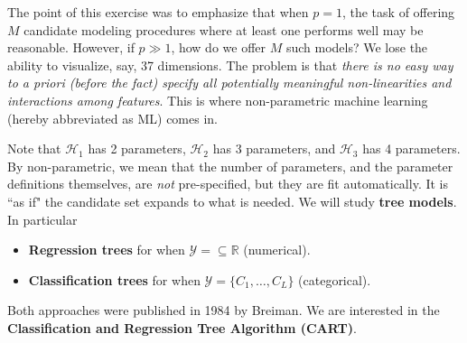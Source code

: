 \documentclass[12pt, a4paper]{article}
\theoremstyle{definition}
\begin{document}
	The point of this exercise was to emphasize that when $p = 1$, the task of
	offering $M$ candidate modeling procedures where at least one performs well
	may be reasonable. However, if $p \gg 1$, how do we offer $M$ such models? We
	lose the ability to visualize, say, 37 dimensions. The problem is that
	\textit{there is no easy way to a priori (before the fact) specify all
	potentially meaningful non-linearities and interactions among features}. This is
	where non-parametric machine learning (hereby abbreviated as ML) comes in.
	
	Note that $\mathcal{H}_1$ has 2 parameters, $\mathcal{H}_2$ has
	3 parameters, and $\mathcal{H}_3$ has 4 parameters.
	By non-parametric, we mean that the number of parameters, and
	the parameter definitions themselves, are \textit{not} pre-specified,
	but they are fit automatically. It is ``as if" the candidate set expands
	to what is needed. We will study \textbf{tree models}. In particular
	\begin{itemize}
		\item \textbf{Regression trees} for when $\mathcal{Y} = \subseteq \mathbb{R}$ (numerical).
		\item \textbf{Classification trees} for when $\mathcal{Y} = \{C_1, \ldots, C_L\}$
		(categorical).
	\end{itemize}
	Both approaches were published in 1984 by Breiman. We are interested in
	the \textbf{Classification and Regression Tree Algorithm (CART)}.
\end{document}
